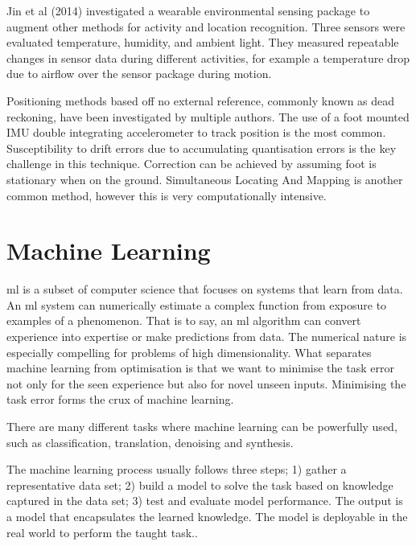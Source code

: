 Jin et al (2014) investigated a wearable environmental sensing package to augment other methods for activity and location recognition. Three sensors were evaluated temperature, humidity, and ambient light. They measured repeatable changes in sensor data during different activities, for example a temperature drop due to airflow over the sensor package during motion.\cite{Jin2014}

Positioning methods based off no external reference, commonly known as dead reckoning, have been investigated by multiple authors. The use of a foot mounted IMU double integrating accelerometer to track position is the most common. Susceptibility to drift errors due to accumulating quantisation errors is the key challenge in this technique. Correction can be achieved by assuming foot is stationary when on the ground.\cite{Yun2007, Nilsson2014} Simultaneous Locating And Mapping is another common method, however this is very computationally intensive.


\section{Machine Learning} %
\acrfull{ml} is a subset of computer science that focuses on systems that learn from data. An \acrshort{ml} system can numerically estimate a complex function from exposure to examples of a phenomenon. That is to say, an \acrshort{ml} algorithm can convert experience into expertise or make predictions from data. The numerical nature is especially compelling for problems of high dimensionality. What separates machine learning from optimisation is that we want to minimise the task error not only for the seen experience but also for novel unseen inputs. Minimising the task error forms the crux of machine learning.\cite{Mitchell1997, Shalev-Shwartz2014, Goodfellow2015, Burkov2019}

There are many different tasks where machine learning can be powerfully used, such as classification, translation, denoising and synthesis.\cite{Goodfellow2015}

The machine learning process usually follows three steps; 1) gather a representative data set; 2) build a model to solve the task based on knowledge captured in the data set; 3) test and evaluate model performance\cite{Burkov2019}. The output is a model that encapsulates the learned knowledge. The model is deployable in the real world to perform the taught task.\cite{Shalev-Shwartz2014}.

